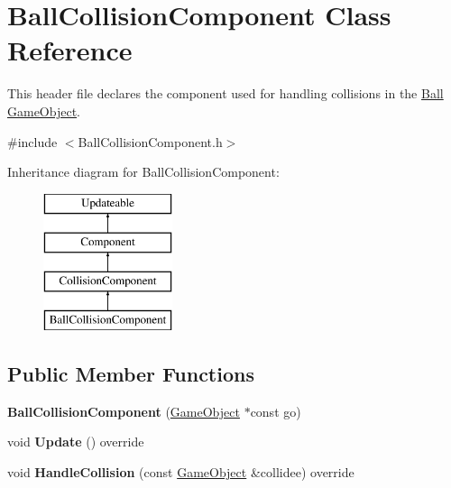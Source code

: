 \hypertarget{class_ball_collision_component}{}\section{Ball\+Collision\+Component Class Reference}
\label{class_ball_collision_component}


This header file declares the component used for handling collisions in the \hyperlink{class_ball}{Ball} \hyperlink{class_game_object}{Game\+Object}.  




{\ttfamily \#include $<$Ball\+Collision\+Component.\+h$>$}

Inheritance diagram for Ball\+Collision\+Component\+:\begin{figure}[H]
\begin{center}
\leavevmode
\includegraphics[height=4.000000cm]{class_ball_collision_component}
\end{center}
\end{figure}
\subsection*{Public Member Functions}
\begin{DoxyCompactItemize}
\item 
\hypertarget{class_ball_collision_component_a89716dc3b14195064f1ba82c1b59f5bb}{}{\bfseries Ball\+Collision\+Component} (\hyperlink{class_game_object}{Game\+Object} $\ast$const go)\label{class_ball_collision_component_a89716dc3b14195064f1ba82c1b59f5bb}

\item 
\hypertarget{class_ball_collision_component_a39e998b01d44fedb05e908a6f10e7202}{}void {\bfseries Update} () override\label{class_ball_collision_component_a39e998b01d44fedb05e908a6f10e7202}

\item 
\hypertarget{class_ball_collision_component_a51ce8485efacd4da61692b79a7d9a87c}{}void {\bfseries Handle\+Collision} (const \hyperlink{class_game_object}{Game\+Object} \&collidee) override\label{class_ball_collision_component_a51ce8485efacd4da61692b79a7d9a87c}

\end{DoxyCompactItemize}
